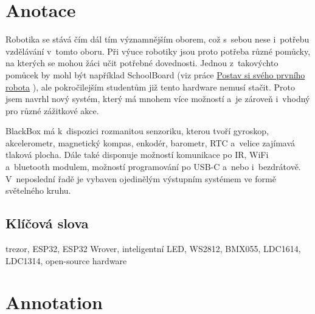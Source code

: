 \documentclass{template/socthesis}
\author{Tomáš Vavrinec} %
\begin{document}
\maketitle



\pagestyle{empty}

\section*{Anotace}
\color{black}

Robotika se stává čím dál tím významnějším oborem, což s~sebou nese i~potřebu vzdělávání v~tomto oboru.
Při výuce robotiky jsou proto potřeba různé pomůcky, na kterých se mohou žáci učit potřebné dovednosti. Jednou z~takovýchto pomůcek 
by mohl být například SchoolBoard 
(viz práce \href{https://github.com/TVavrinec/SOC-text/blob/master/SOC.pdf}{Postav si svého prvního robota} \parencite{soc2020}), 
ale pokročilejším studentům již tento hardware nemusí stačit. Proto jsem navrhl nový systém, který má mnohem více možností a~je zároveň 
i~vhodný pro různé zážitkové akce. 

BlackBox má k~dispozici rozmanitou senzoriku, kterou tvoří 
gyroskop, akcelerometr, magnetický kompas, enkodér, barometr, RTC a~velice zajímavá tlaková plocha. Dále také disponuje 
možností komunikace po IR, WiFi a~bluetooth modulem, možností programování po USB-C a~nebo i~bezdrátově.
V~neposlední řadě je vybaven ojedinělým výstupním systémem ve formě světelného kruhu.

\subsection*{Klíčová slova}

\color{black}

trezor, ESP32, ESP32 Wrover, inteligentní LED, WS2812, BMX055, LDC1614, LDC1314, open-source hardware

\newpage

\vspace{20mm}

\section*{Annotation}
\color{black}
\end{document}
